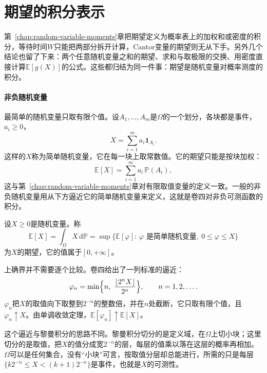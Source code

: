 \section{期望的积分表示}
\label{sec:pspace-expectation}

第~\ref{chap:random-variable-moments}章把期望定义为概率表上的加权和或密度的积分，等待时间$W$只能把两部分拆开计算，Cantor变量的期望则无从下手。另外几个结论也留了下来：两个任意随机变量之和的期望、求和与取极限的交换、用密度直接计算$\mathbb{E}[g(X)]$的公式。这些都归结为同一件事：期望是随机变量对概率测度的积分。

\paragraph{非负随机变量}
最简单的随机变量只取有限个值。设$A_1,\dots,A_m$是$\Omega$的一个划分，各块都是事件，$a_i\geq0$，
\[
  X=\sum_{i=1}^{m}a_i\mathbf{1}_{A_i}.
\]
这样的$X$称为简单随机变量，它在每一块上取常数值。它的期望只能是按块加权：
\[
  \mathbb{E}[X]=\sum_{i=1}^{m}a_i\,\mathbb{P}(A_i),
\]
这与第~\ref{chap:random-variable-moments}章对有限取值变量的定义一致。一般的非负随机变量用从下方逼近它的简单随机变量来定义，这就是卷四对非负可测函数的积分。

\begin{definition}[非负随机变量的期望]
\label{def:pspace-expectation-nonnegative}
设$X\geq0$是随机变量。称
\begin{equation}
  \mathbb{E}[X]=\int_{\Omega}X\,\mathrm{d}\mathbb{P}=\sup\bigl\{\mathbb{E}[\varphi]:\ \varphi\text{ 是简单随机变量},\ 0\leq\varphi\leq X\bigr\}
  \label{eq:pspace-expectation-nonnegative}
\end{equation}
为$X$的期望，它的值属于$[0,+\infty]$。
\end{definition}

上确界并不需要逐个比较。卷四给出了一列标准的逼近：
\begin{equation}
  \varphi_n=\min\Bigl\{n,\ \frac{\lfloor2^{n}X\rfloor}{2^{n}}\Bigr\},\qquad n=1,2,\dots .
  \label{eq:pspace-simple-approx}
\end{equation}
$\varphi_n$把$X$的取值向下取整到$2^{-n}$的整数倍，并在$n$处截断，它只取有限个值，且$\varphi_n\uparrow X$。由单调收敛定理，$\mathbb{E}[\varphi_n]\uparrow\mathbb{E}[X]$。

这个逼近与黎曼积分的思路不同。黎曼积分切分的是定义域，在$\Omega$上切小块；这里切分的是取值，把$X$的值分成宽$2^{-n}$的层，每层的值乘以落在这层的概率再相加。$\Omega$可以是任何集合，没有“小块”可言，按取值分层却总能进行，所需的只是每层$\{k2^{-n}\leq X<(k+1)2^{-n}\}$是事件，也就是$X$的可测性。

